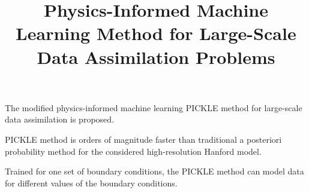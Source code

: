 \documentclass{agujournal2019}
\begin{document}
\title{Physics-Informed Machine Learning Method for Large-Scale Data Assimilation Problems}







\begin{keypoints}
\item The modified physics-informed machine learning PICKLE method for large-scale data assimilation is proposed.  
\item PICKLE method is orders of magnitude faster than traditional a posteriori probability method for the considered high-resolution Hanford model. 
\item Trained for one set of boundary conditions, the PICKLE method can model data for different values of the boundary conditions.      
\end{keypoints}
\end{document}
